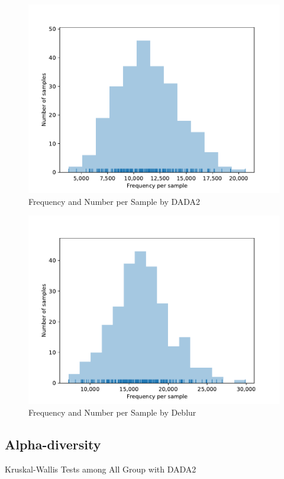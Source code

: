 \documentclass[a4paper]{article}
\begin{document}
            \begin{figure}[p]
                \centering
                \includegraphics[width=0.6 \linewidth]{figures/Rarefaction/DADA.pdf}
                \caption{Frequency and Number per Sample by DADA2}
                \label{fig:frequency-sample-dada2}
            \end{figure}

            \begin{figure}[p]
                \centering
                \includegraphics[width=0.6 \linewidth]{figures/Rarefaction/Deblur.pdf}
                \caption{Frequency and Number per Sample by Deblur}
                \label{fig:frequency-sample-deblur}
            \end{figure}

        \subsection{Alpha-diversity}

            \begin{table}[p]
                \centering
                \caption{Kruskal-Wallis Tests among All Group with DADA2}
                \label{tb:alpha-all-dada2}
            \end{table}
\end{document}
